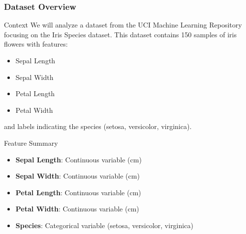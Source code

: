 \documentclass[aspectratio=169]{beamer}
\begin{document}
\begin{frame}
    \frametitle{Dataset Overview}
    \begin{block}{Context}
        We will analyze a dataset from the UCI Machine Learning Repository focusing on the Iris Species dataset.
        This dataset contains 150 samples of iris flowers with features: 
        \begin{itemize}
            \item Sepal Length
            \item Sepal Width
            \item Petal Length
            \item Petal Width
        \end{itemize}
        and labels indicating the species (setosa, versicolor, virginica).
    \end{block}

    \begin{block}{Feature Summary}
        \begin{itemize}
            \item \textbf{Sepal Length}: Continuous variable (cm)
            \item \textbf{Sepal Width}: Continuous variable (cm)
            \item \textbf{Petal Length}: Continuous variable (cm)
            \item \textbf{Petal Width}: Continuous variable (cm)
            \item \textbf{Species}: Categorical variable (setosa, versicolor, virginica)
        \end{itemize}
    \end{block}
\end{frame}
\end{document}
